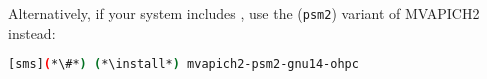 Alternatively, if your system includes \IntelR{} \OmniPath{}, use the (\texttt{psm2})
variant of MVAPICH2 instead:

\begin{lstlisting}[language=bash]
[sms](*\#*) (*\install*) mvapich2-psm2-gnu14-ohpc
\end{lstlisting}

